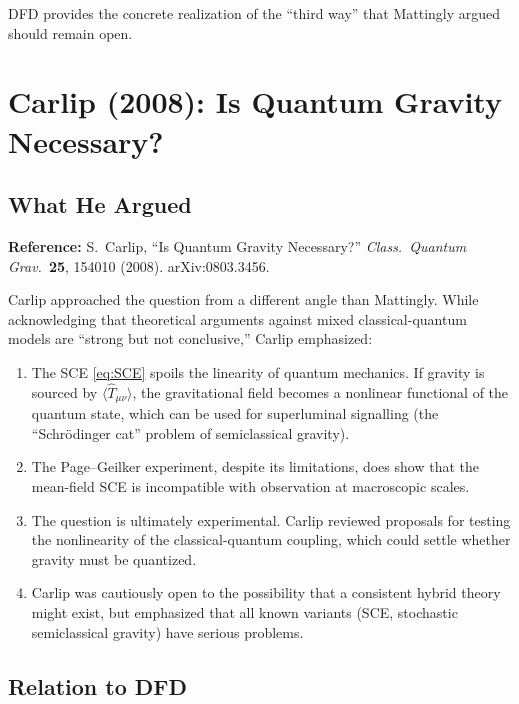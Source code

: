 \documentclass[12pt,a4paper]{article}
\begin{document}
DFD provides the concrete realization of the ``third way'' that Mattingly argued should remain open.


\section{Carlip (2008): Is Quantum Gravity Necessary?}
\label{sec:carlip}

\subsection{What He Argued}

\textbf{Reference:} S.\ Carlip, ``Is Quantum Gravity Necessary?'' \textit{Class.\ Quantum Grav.}\ \textbf{25}, 154010 (2008). arXiv:0803.3456.

Carlip approached the question from a different angle than Mattingly. While acknowledging that theoretical arguments against mixed classical-quantum models are ``strong but not conclusive,'' Carlip emphasized:

\begin{enumerate}
\item The SCE \eqref{eq:SCE} spoils the linearity of quantum mechanics. If gravity is sourced by $\langle\hat{T}_{\mu\nu}\rangle$, the gravitational field becomes a nonlinear functional of the quantum state, which can be used for superluminal signalling (the ``Schr\"odinger cat'' problem of semiclassical gravity).

\item The Page--Geilker experiment, despite its limitations, does show that the mean-field SCE is incompatible with observation at macroscopic scales.

\item The question is ultimately experimental. Carlip reviewed proposals for testing the nonlinearity of the classical-quantum coupling, which could settle whether gravity must be quantized.

\item Carlip was cautiously open to the possibility that a consistent hybrid theory might exist, but emphasized that all known variants (SCE, stochastic semiclassical gravity) have serious problems.
\end{enumerate}

\subsection{Relation to DFD}
\end{document}
